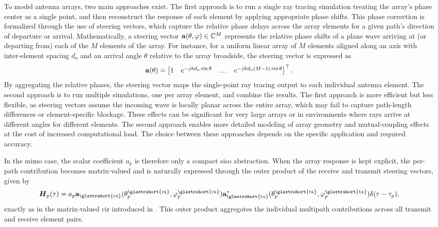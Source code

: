To model antenna arrays, two main approaches exist. The first approach is to run a single ray tracing simulation treating the array's phase center as a single point, and then reconstruct the response of each element by applying appropriate phase shifts. This phase correction is formalized through the use of steering vectors, which capture the relative phase delays across the array elements for a given path's direction of departure or arrival. Mathematically, a steering vector $\mathbf{a}(\theta, \varphi) \in \mathbb{C}^M$ represents the relative phase shifts of a plane wave arriving at (or departing from) each of the $M$ elements of the array. For instance, for a uniform linear array of $M$ elements aligned along an axis with inter-element spacing $d_{a}$ and an arrival angle $\theta$ relative to the array broadside, the steering vector is expressed as
\begin{equation}
  \mathbf{a}(\theta) =
  \begin{bmatrix} 1 & e^{-jk d_{a} \sin\theta} & \dots & e^{-jk d_{a} (M-1) \sin\theta}
  \end{bmatrix}^\top.
\end{equation}
By aggregating the relative phases, the steering vector maps the single-point ray tracing output to each individual antenna element. The second approach is to run multiple simulations, one per array element, and combine the results. The first approach is more efficient but less flexible, as steering vectors assume the incoming wave is locally planar across the entire array, which may fail to capture path-length differences or element-specific blockage. These effects can be significant for very large arrays or in environments where rays arrive at different angles for different elements. The second approach enables more detailed modeling of array geometry and mutual-coupling effects at the cost of increased computational load. The choice between these approaches depends on the specific application and required accuracy.

In the \gls{mimo} case, the scalar coefficient $a_p$ is therefore only a compact \gls{siso} abstraction. When the array response is kept explicit, the per-path contribution becomes matrix-valued and is naturally expressed through the outer product of the receive and transmit steering vectors, given by
\begin{equation}
  \bsit{H}_p(\tau) = a_p \bsup{a}_{\text{\glsxtrshort{rx}}}(\theta_p^{\text{\glsxtrshort{rx}}}, \varphi_p^{\text{\glsxtrshort{rx}}}) \bsup{a}_{\text{\glsxtrshort{tx}}}^{*}(\theta_p^{\text{\glsxtrshort{tx}}}, \varphi_p^{\text{\glsxtrshort{tx}}}) \delta(\tau - \tau_p),
\end{equation}
exactly as in the matrix-valued \gls{cir} introduced in . This outer product aggregates the individual multipath contributions across all transmit and receive element pairs.

